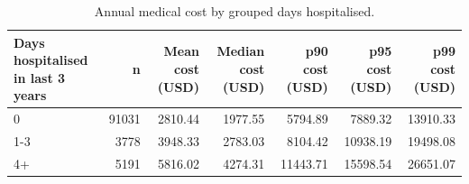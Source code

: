 \begin{table}
\caption{Annual medical cost by grouped days hospitalised.}
\label{tab:02-days-hospitalised-grouped-summary}
\begin{tabular}{lrrrrrr}
\toprule
Days hospitalised in last 3 years & n & Mean cost (USD) & Median cost (USD) & p90 cost (USD) & p95 cost (USD) & p99 cost (USD) \\
\midrule
0 & 91031 & 2810.44 & 1977.55 & 5794.89 & 7889.32 & 13910.33 \\
1-3 & 3778 & 3948.33 & 2783.03 & 8104.42 & 10938.19 & 19498.08 \\
4+ & 5191 & 5816.02 & 4274.31 & 11443.71 & 15598.54 & 26651.07 \\
\bottomrule
\end{tabular}
\end{table}
